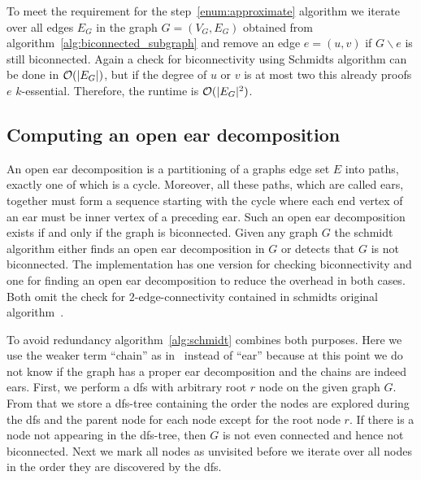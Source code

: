 To meet the requirement for the step~\ref{enum:approximate} algorithm we iterate over all edges \(E_G\) in the graph \(G = (V_G, E_G)\) obtained from algorithm~\ref{alg:biconnected_subgraph} and remove an edge \(e = (u, v)\) if \(G \backslash e\) is still biconnected. Again a check for biconnectivity using Schmidts algorithm can be done in \(\mathcal{O}(\vert E_G \vert)\), but if the degree of \(u\) or \(v\) is at most two this already proofs \(e\) \(k\)-essential. Therefore, the runtime is \(\mathcal{O}(\vert {E_G} \vert^2)\).

\subsection{Computing an open ear decomposition}\label{subsec:open_ear_decomposition}

An open ear decomposition is a partitioning of a graphs edge set \(E\) into paths, exactly one of which is a cycle. Moreover, all these paths, which are called ears, together must form a sequence starting with the cycle where each end vertex of an ear must be inner vertex of a preceding ear.
Such an open ear decomposition exists if and only if the graph is biconnected.
Given any graph \(G\) the schmidt algorithm either finds an open ear decomposition in \(G\) or detects that \(G\) is not biconnected. The implementation has one version for checking biconnectivity and one for finding an open ear decomposition to reduce the overhead in both cases. Both omit the check for \(2\)-edge-connectivity contained in schmidts original algorithm~\cite{schmidt2013}.

To avoid redundancy algorithm~\ref{alg:schmidt} combines both purposes. Here we use the weaker term \enquote{chain} as in~\cite{schmidt2013} instead of \enquote{ear} because at this point we do not know if the graph has a proper ear decomposition and the chains are indeed ears.
First, we perform a \gls{dfs} with arbitrary root \(r\) node on the given graph \(G\). From that we store a \gls{dfs}-tree containing the order the nodes are explored during the \gls{dfs} and the parent node for each node except for the root node \(r\). If there is a node not appearing in the \gls{dfs}-tree, then \(G\) is not even connected and hence not biconnected. Next we mark all nodes as unvisited before we iterate over all nodes in the order they are discovered by the \gls{dfs}.

